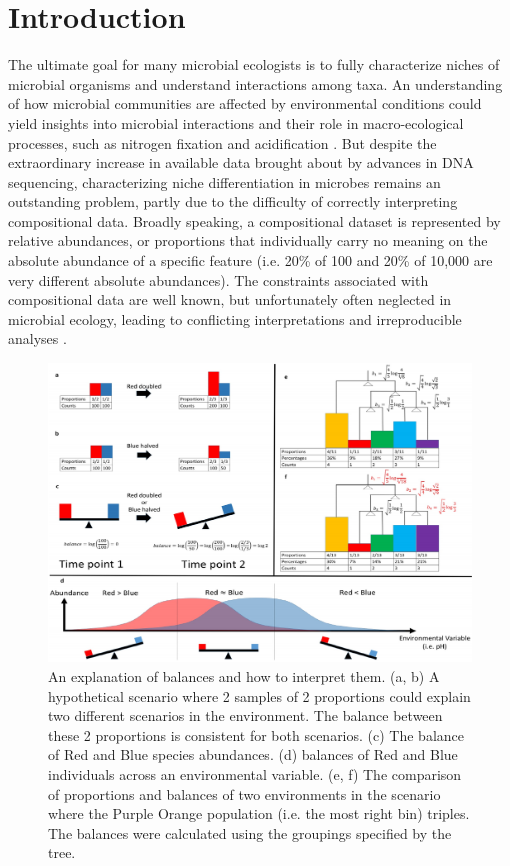 \section{Introduction}
The ultimate goal for many microbial ecologists is to fully characterize niches of microbial organisms and understand interactions among taxa.  An understanding of how microbial communities are affected by environmental conditions could yield insights into microbial interactions and their role in macro-ecological processes, such as nitrogen fixation \cite{nitrogen_fixation} and acidification \cite{acidification}. But despite the extraordinary increase in available data brought about by advances in DNA sequencing, characterizing niche differentiation in microbes remains an outstanding problem, partly due to the difficulty of correctly interpreting compositional data.  Broadly speaking, a compositional dataset is represented by relative abundances, or proportions that individually carry no meaning on the absolute abundance of a specific feature (i.e. 20\% of 100 and 20\% of 10,000 are very different absolute abundances).  The constraints associated with compositional data are well known, but unfortunately often neglected in microbial ecology, leading to conflicting interpretations and irreproducible analyses \cite{gloor_epi, fodor_coda} .\par
\begin{figure}[H]
        \centering
        \includegraphics[width=1\textwidth]{ch3/Figure1.pdf}
        \caption[An explanation of balances and how to interpret them.]
        {An explanation of balances and how to interpret them. (a, b) A hypothetical scenario where 2 samples of 2 proportions could explain two different scenarios in the environment.  The balance between these 2 proportions is consistent for both scenarios.  (c) The balance of Red and Blue species abundances.  (d) balances of Red and Blue individuals across an environmental variable.  (e, f) The comparison of proportions and balances of two environments in the scenario where the Purple Orange population (i.e. the most right bin) triples. The balances were calculated using the groupings specified by the tree.}
        \label{figc1}
\end{figure}
